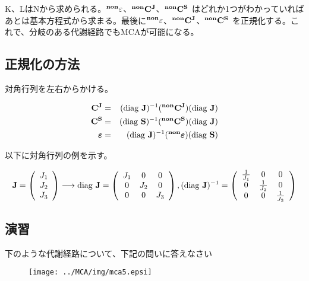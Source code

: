 K、LはNから求められる。\({\bf {}^{non}\varepsilon}\)、\({\bf {}^{non}C^J}\)、\({\bf {}^{non}C^S}\) はどれか1つがわかっていればあとは基本方程式から求まる。最後に\({\bf {}^{non}\varepsilon}\)、\({\bf {}^{non}C^J}\)、\({\bf {}^{non}C^S}\) を正規化する。これで、分岐のある代謝経路でもMCAが可能になる。

\subsection{正規化の方法}
対角行列を左右からかける。

\begin{eqnarray*}
{\bf C^J} & = & ({\rm diag}\ {\bf J})^{-1}({\bf {}^{non}C^J})({\rm diag}\ \bf J)\\
{\bf C^S} & = & ({\rm diag}\ {\bf S})^{-1}({\bf {}^{non}C^S})({\rm diag}\ \bf J)\\
{\boldsymbol \varepsilon} & = & ({\rm diag}\ {\bf J})^{-1}({\bf {}^{non}\boldsymbol \varepsilon})({\rm diag}\ \bf S)
\end{eqnarray*}

以下に対角行列の例を示す。

\[
{\bf J}=\left(
\begin{array}{r}
J_1\\
J_2\\
J_3
\end{array}
\right)
\longrightarrow
{\rm diag}\ {\bf J}=\left(
\begin{array}{ccc}
J_1 & 0 & 0 \\
0   & J_2 & 0\\
0   & 0   & J_3
\end{array}
\right)
,
({\rm diag}\ {\bf J})^{-1}=\left(
\begin{array}{ccc}
\frac{1}{J_1} & 0 & 0 \\
0   & \frac{1}{J_2} & 0\\
0   & 0   & \frac{1}{J_3}
\end{array}
\right)
\]
\subsection{演習}
下のような代謝経路について、下記の問いに答えなさい
\begin{figure}[h]
\begin{center}
\texttt{[image: ../MCA/img/mca5.epsi]}
\end{center}
\end{figure}

